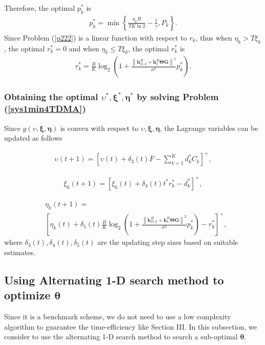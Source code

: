 \documentclass[journal]{IEEEtran}
\begin{document}
Therefore, the optimal $p^*_k$ is
\begin{align}\label{p}
p^*_k=\min \left\{\frac{\eta_kB}{TK\ln 2}-\frac{1}{\gamma}, P_k\right\}.
\end{align} %
Since Problem (\ref{p222}) is a linear function with respect to $r_k$, thus when $\eta_k>T\xi_k$, the optimal $r^*_k=0$ and when $\eta_k\leq T\xi_k$, the optimal $r^*_k$ is
{\begin{align}\label{r}
r^*_k=\frac{B}{K}\log_2\left( 1+ \frac{\left\|\pmb h_{D,k}^H +\pmb h_{k}^H \pmb \Theta \pmb G \right\|^2}{\sigma^2}  {p^*_k} \right).
\end{align}}

\subsubsection{Obtaining the optimal $\upsilon^*,\pmb \xi^*,\pmb \eta^*$ by solving Problem (\ref{sys1min4TDMA})}
Since $g(\upsilon,\pmb \xi,\pmb \eta)$ is convex with respect to $\upsilon,\pmb \xi,\pmb \eta$, the Lagrange variables can be updated as follows

\begin{align}\label{l3}
\upsilon(t+1)=\left[\upsilon(t)+\delta_3(t)F-\sum_{k=1}^K d^*_kC_k  \right]^+,
\end{align}

\begin{align}\label{l4}
\xi_k(t+1)=\left[\xi_k(t)+\delta_4(t)t^*r^*_k- d^*_k  \right]^+,
\end{align}

{\begin{align}\label{l5}
&\eta_k(t+1)=\\\nonumber
&\left[\eta_k(t)+\delta_5(t)\frac{B}{K}\log_2\left( 1+ \frac{\left\|\pmb h_{D,k}^H +\pmb h_{k}^H \pmb \Theta \pmb G \right\|^2}{\sigma^2}  {p^*_k} \right)-r^*_k \right]^+,
\end{align}}
where $\delta_3(t), \delta_4(t), \delta_5(t)$ are the updating step sizes based on suitable estimates.

\subsection{Using Alternating 1-D search method to optimize $\pmb \theta$}
Since it is a benchmark scheme, we do not need to use a low complexity algorithm to guarantee the time-efficiency like Section III. In this subsection, we consider to use the alternating 1-D search method to search a sub-optimal $\pmb\theta$.
\end{document}
